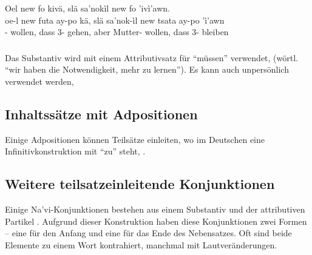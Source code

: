 \begin{interlin}
	\glll Oel new  fo kivä, slä sa'nokìl new  fo 'ivì'awn. \\
	oe-l new futa ay-po kä, slä sa'nok-ìl new tsata ay-po 'ì'awn\\
	- wollen, dass 3- gehen, aber Mutter- wollen, dass 3- bleiben \\
\end{interlin}

\subsubsection{} Das Substantiv   wird mit einem Attributivsatz für ``müssen'' verwendet,   (wörtl. ``wir haben die Notwendigkeit, mehr zu lernen''). 
Es kann auch unpersönlich verwendet werden,  

\subsection{Inhaltssätze mit Adpositionen} Einige Adpositionen können Teilsätze einleiten, wo im Deutschen eine Infinitivkonstruktion mit ``zu'' steht,  .
\label{syn:rel:nom-adp}


\subsection{Weitere teilsatzeinleitende Konjunktionen} Einige Na'vi-Konjunktionen bestehen aus einem Substantiv und der attributiven Partikel . Aufgrund dieser Konstruktion haben diese Konjunktionen zwei Formen -- eine für den Anfang und eine für das Ende des Nebensatzes. Oft sind beide Elemente zu einem Wort kontrahiert, manchmal mit Lautveränderungen.


